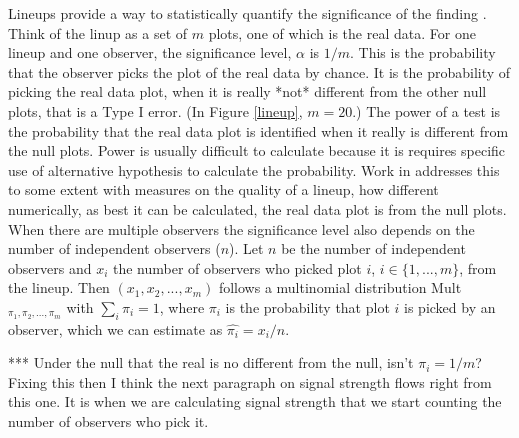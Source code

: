 Lineups provide a way to statistically quantify the significance of the finding
\citet{majumder:2011}. Think of the linup as a set of $m$ plots, one of which is the real data. For one lineup and one observer, the significance level, $\alpha$ is $1/m$. This is the probability that the observer picks the plot of the real data by chance. It is the probability of picking the real data plot, when it is really *not* different from the other null plots, that is a Type I error. (In Figure \ref{lineup}, $m=20$.) The power of a test is the probability that the real data plot is identified when it really is different from the null plots. Power is usually difficult to calculate because it is requires specific use of alternative hypothesis to calculate the probability.  Work in \citet{niladri:2012} addresses this to some extent with measures on the quality of a lineup, how different numerically, as best it can be calculated, the real data plot is from the null plots. 
%
When there are multiple observers the significance level also depends on the number of independent observers ($n$). Let $n$ be the number of independent observers and $x_i$ the number of observers who picked plot $i$, $i \in \{1, ..., m\}$, from the lineup. Then $(x_1, x_2, ..., x_m)$ follows a multinomial distribution Mult$_{\pi_1, \pi_2, ..., \pi_m}$ with $\sum_i \pi_i = 1$, where $\pi_i$ is the probability that plot $i$ is picked by an observer, which we can estimate as $\widehat{\pi_i} = x_i/n$. 

*** Under the null that the real is no different from the null, isn't $\pi_i=1/m$? Fixing this then I think the next paragraph on signal strength flows right from this one. It is when we are calculating signal strength that we start counting the number of observers who pick it.



